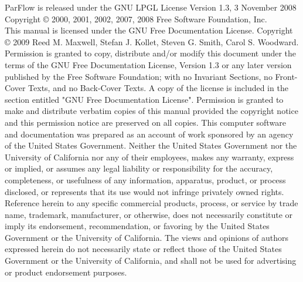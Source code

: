 
\begin{CopyrightPage}
\noindent ParFlow is released under the GNU LPGL License \newline
\noindent Version 1.3, 3 November 2008 \newline
\noindent Copyright \copyright{} 2000, 2001, 2002, 2007, 2008  Free Software Foundation, Inc.\newline
{}\\
This manual is licensed under the GNU Free Documentation License.\newline\vspace{1em}
Copyright \copyright{} 2009  Reed M. Maxwell, Stefan J. Kollet, Steven G. Smith, Carol S. Woodward. 
Permission is granted to copy, distribute and/or modify this document
under the terms of the GNU Free Documentation License, Version 1.3
or any later version published by the Free Software Foundation; with no Invariant Sections, no Front-Cover Texts, and no Back-Cover Texts. A copy of the license is included in the section entitled "GNU Free Documentation License".\newline\vspace{1em}
Permission is granted to make and distribute verbatim copies of this
manual provided the copyright notice and this permission notice are
preserved on all copies.\newline\vspace{0.1em}
This computer software and documentation was prepared as an account of
work sponsored by an agency of the United  States Government.  Neither
the United States Government nor the  University of California nor any
of their employees, makes any warranty, express or implied, or assumes
any legal liability  or responsibility for the accuracy, completeness,
or   usefulness of any   information,  apparatus, product, or  process
disclosed,   or represents that  its  use would not infringe privately
owned rights.  Reference  herein to any specific  commercial products,
process,   or service by   trade  name,  trademark,  manufacturer,  or
otherwise, does not  necessarily constitute or imply its  endorsement,
recommendation, or  favoring  by the  United  States Government or the
University of California.  The views and opinions of authors expressed
herein do not necessarily state or reflect those  of the United States
Government or the University of California, and shall  not be used for
advertising or product endorsement purposes.
\end{CopyrightPage}


